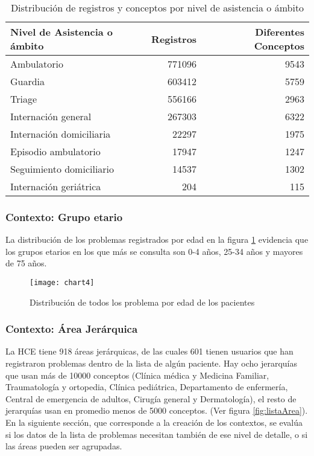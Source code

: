 \begin{table}[tb]
\centering
\caption{Distribución de registros y conceptos por nivel de asistencia o ámbito }
\label{nivel_asistencia}
\begin{tabular}{@{}lrr@{}}
\toprule
Nivel de Asistencia o ámbito & Registros & Diferentes Conceptos \\ \midrule
Ambulatorio & \num{771096} & \num{9543} \\
Guardia & \num{603412} & \num{5759} \\
Triage & \num{556166} & \num{2963} \\
Internación general & \num{267303} & \num{6322} \\
Internación domiciliaria & \num{22297} & \num{1975}\\
Episodio ambulatorio & \num{17947} & \num{1247} \\
Seguimiento domiciliario & \num{14537} & \num{1302} \\
Internación geriátrica & \num{204} & \num{115} \\ \bottomrule
\end{tabular}
\end{table}

\subsubsection{Contexto: Grupo etario}
La distribución de los problemas registrados por edad en la figura \ref{fig:listaEdad} evidencia que los grupos etarios en los que más se consulta son 0-4 años, 25-34 años y mayores de 75 años.

\begin{figure}[htbp]
\caption{Distribución de todos los problema por edad de los pacientes}
\label{fig:listaEdad}
\centering
\texttt{[image: chart4]}
\end{figure}

\subsubsection{Contexto: Área Jerárquica}
La \acrshort{HCE} tiene 918 áreas jerárquicas, de las cuales 601 tienen usuarios que han registraron problemas dentro de la lista de algún paciente. Hay ocho jerarquías que usan más de \num{10000} conceptos (Clínica médica y Medicina Familiar, Traumatología y ortopedia, Clínica pediátrica, Departamento de enfermería, Central de emergencia de adultos, Cirugía general y Dermatología), el resto de jerarquías usan en promedio menos de \num{5000} conceptos. (Ver figura \ref{fig:listaArea}).  En la siguiente sección, que corresponde a la creación de los contextos, se evalúa si los datos de la lista de problemas necesitan también de ese nivel de detalle, o si las áreas pueden ser agrupadas.

